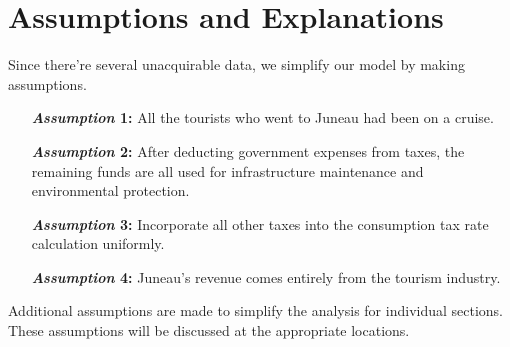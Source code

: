 \documentclass[12pt]{article}  %
\begin{document}
 
 \section{Assumptions and Explanations}
 
Since there're several unacquirable data, we simplify our model by making assumptions.
 
 \begin{itemize}
     \setlength{\parsep}{0ex} %
     \setlength{\topsep}{2ex} %
     \setlength{\itemsep}{1ex} %
     \item[\bfseries \textit{Assumption} 1:] All the tourists who went to Juneau had been on a cruise.
     \vspace{1ex}
     \item[\bfseries \textit{Assumption} 2:] After deducting government expenses from taxes, the remaining funds are all used for infrastructure maintenance and environmental protection.
     \vspace{1ex}
     \item[\bfseries \textit{Assumption} 3:] Incorporate all other taxes into the consumption tax rate calculation uniformly.
     \vspace{1ex}
     \item[\bfseries \textit{Assumption} 4:] Juneau's revenue comes entirely from the tourism industry.
 \end{itemize}
 
 Additional assumptions are made to simplify the analysis for individual sections. These assumptions will be discussed at the appropriate locations.
 \clearpage
\end{document}
